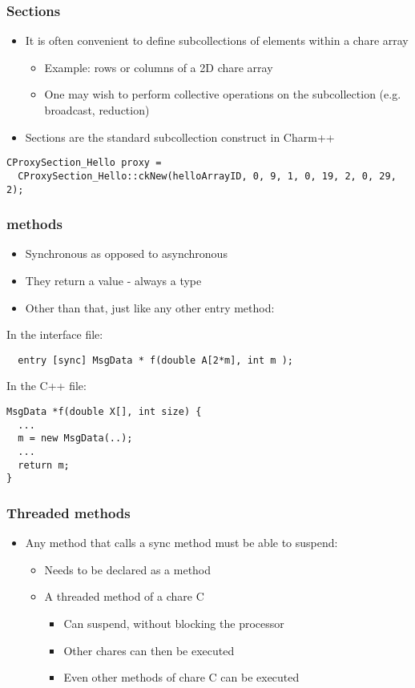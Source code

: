 \begin{frame}[fragile]
\frametitle{Sections}
\begin{itemize}
 \item It is often convenient to define subcollections of elements within a
   chare array
   \begin{itemize}
   \item Example: rows or columns of a 2D chare array
   \item One may wish to perform collective operations on the subcollection
     (e.g. broadcast, reduction)
   \end{itemize}
 \item Sections are the standard subcollection construct in Charm++

\end{itemize}
\begin{lstlisting}
CProxySection_Hello proxy =
  CProxySection_Hello::ckNew(helloArrayID, 0, 9, 1, 0, 19, 2, 0, 29, 2);
\end{lstlisting}
\end{frame}

\begin{frame}[fragile]
\frametitle{ methods}
\begin{itemize}
 \item Synchronous as opposed to asynchronous
 \item They return a value - always a  type
 \item Other than that, just like any other entry method:
\end{itemize}
In the interface file:
\begin{lstlisting}
  entry [sync] MsgData * f(double A[2*m], int m ); 
\end{lstlisting}

In the C++ file:
\begin{lstlisting}
MsgData *f(double X[], int size) {
  ...
  m = new MsgData(..);
  ...
  return m;
}
\end{lstlisting}
\end{frame}

\begin{frame}[fragile]
\frametitle{Threaded methods}
\begin{itemize}
\item Any method that calls a sync method must be able to suspend:
  \begin{itemize}
  \item Needs to be declared as a  method
  \item A threaded method of a chare C
    \begin{itemize}
    \item Can suspend, without blocking the processor
    \item Other chares can then be executed
    \item Even other methods of chare C can be executed
    \end{itemize}
  \end{itemize}
\end{itemize}
\end{frame}

